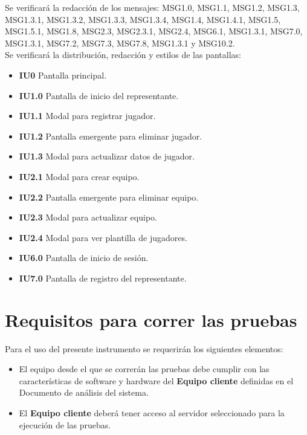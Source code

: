 \documentclass[oneside,10pt]{book}
\begin{document}
	Se verificará la redacción de los mensajes: MSG1.0, MSG1.1, MSG1.2, MSG1.3, MSG1.3.1, MSG1.3.2, MSG1.3.3, MSG1.3.4, MSG1.4, MSG1.4.1, MSG1.5, MSG1.5.1, MSG1.8, MSG2.3, MSG2.3.1, MSG2.4, MSG6.1, MSG1.3.1, MSG7.0, MSG1.3.1, MSG7.2, MSG7.3, MSG7.8, MSG1.3.1 y MSG10.2.\\
	
	Se verificará la distribución, redacción y estilos de las pantallas:

\begin{itemize}
\item \textbf{IU0} Pantalla principal.
\item \textbf{IU1.0} Pantalla de inicio del representante.
\item \textbf{IU1.1} Modal para registrar jugador.
\item \textbf{IU1.2} Pantalla emergente para eliminar jugador.
\item \textbf{IU1.3} Modal para actualizar datos de jugador.
\item \textbf{IU2.1} Modal para crear equipo.
\item \textbf{IU2.2} Pantalla emergente para eliminar equipo.
\item \textbf{IU2.3} Modal para actualizar equipo.
\item \textbf{IU2.4} Modal para ver plantilla de jugadores.
\item \textbf{IU6.0} Pantalla de inicio de sesión.
\item \textbf{IU7.0} Pantalla de registro del representante.
\end{itemize}	

\section{Requisitos para correr las pruebas}

Para el uso del presente instrumento se requerirán los siguientes elementos:

\begin{itemize}
	\item El equipo desde el que se correrán las pruebas debe cumplir con las características de software y hardware del \textbf{Equipo cliente} definidas en el Documento de análisis del sistema.
	\item El \textbf{Equipo cliente} deberá tener acceso al servidor seleccionado para la ejecución de las pruebas.
\end{itemize}
\end{document}
